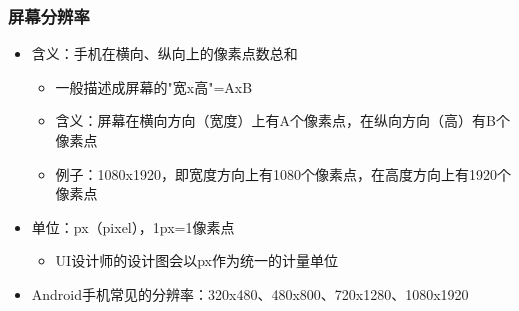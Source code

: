 \documentclass[9pt, b5paper]{article}
\begin{document}
\subsubsection{屏幕分辨率}
\label{sec-6-4-2}
\begin{itemize}
\item 含义：手机在横向、纵向上的像素点数总和
\begin{itemize}
\item 一般描述成屏幕的"宽x高"=AxB
\item 含义：屏幕在横向方向（宽度）上有A个像素点，在纵向方向（高）有B个像素点
\item 例子：1080x1920，即宽度方向上有1080个像素点，在高度方向上有1920个像素点
\end{itemize}
\item 单位：px（pixel），1px=1像素点
\begin{itemize}
\item UI设计师的设计图会以px作为统一的计量单位
\end{itemize}
\item Android手机常见的分辨率：320x480、480x800、720x1280、1080x1920
\end{itemize}
\end{document}
